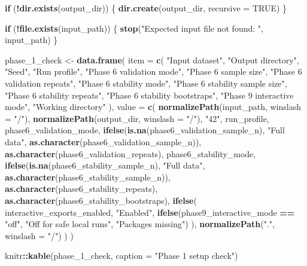 \documentclass[
]{article}
\newenvironment{Shaded}{\begin{snugshade}}{\end{snugshade}}
\newcommand{\AttributeTok}[1]{\textcolor[rgb]{0.13,0.29,0.53}{#1}}
\newcommand{\ConstantTok}[1]{\textcolor[rgb]{0.56,0.35,0.01}{#1}}
\newcommand{\ControlFlowTok}[1]{\textcolor[rgb]{0.13,0.29,0.53}{\textbf{#1}}}
\newcommand{\FunctionTok}[1]{\textcolor[rgb]{0.13,0.29,0.53}{\textbf{#1}}}
\newcommand{\NormalTok}[1]{#1}
\newcommand{\OtherTok}[1]{\textcolor[rgb]{0.56,0.35,0.01}{#1}}
\newcommand{\SpecialCharTok}[1]{\textcolor[rgb]{0.81,0.36,0.00}{\textbf{#1}}}
\newcommand{\StringTok}[1]{\textcolor[rgb]{0.31,0.60,0.02}{#1}}
\begin{document}
\begin{Shaded}
\begin{Highlighting}[]
\ControlFlowTok{if}\NormalTok{ (}\SpecialCharTok{!}\FunctionTok{dir.exists}\NormalTok{(output\_dir)) \{}
  \FunctionTok{dir.create}\NormalTok{(output\_dir, }\AttributeTok{recursive =} \ConstantTok{TRUE}\NormalTok{)}
\NormalTok{\}}

\ControlFlowTok{if}\NormalTok{ (}\SpecialCharTok{!}\FunctionTok{file.exists}\NormalTok{(input\_path)) \{}
  \FunctionTok{stop}\NormalTok{(}\StringTok{"Expected input file not found: "}\NormalTok{, input\_path)}
\NormalTok{\}}

\NormalTok{phase\_1\_check }\OtherTok{\textless{}{-}} \FunctionTok{data.frame}\NormalTok{(}
  \AttributeTok{item =} \FunctionTok{c}\NormalTok{(}
    \StringTok{"Input dataset"}\NormalTok{,}
    \StringTok{"Output directory"}\NormalTok{,}
    \StringTok{"Seed"}\NormalTok{,}
    \StringTok{"Run profile"}\NormalTok{,}
    \StringTok{"Phase 6 validation mode"}\NormalTok{,}
    \StringTok{"Phase 6 sample size"}\NormalTok{,}
    \StringTok{"Phase 6 validation repeats"}\NormalTok{,}
    \StringTok{"Phase 6 stability mode"}\NormalTok{,}
    \StringTok{"Phase 6 stability sample size"}\NormalTok{,}
    \StringTok{"Phase 6 stability repeats"}\NormalTok{,}
    \StringTok{"Phase 6 stability bootstraps"}\NormalTok{,}
    \StringTok{"Phase 9 interactive mode"}\NormalTok{,}
    \StringTok{"Working directory"}
\NormalTok{  ),}
  \AttributeTok{value =} \FunctionTok{c}\NormalTok{(}
    \FunctionTok{normalizePath}\NormalTok{(input\_path, }\AttributeTok{winslash =} \StringTok{"/"}\NormalTok{),}
    \FunctionTok{normalizePath}\NormalTok{(output\_dir, }\AttributeTok{winslash =} \StringTok{"/"}\NormalTok{),}
    \StringTok{"42"}\NormalTok{,}
\NormalTok{    run\_profile,}
\NormalTok{    phase6\_validation\_mode,}
    \FunctionTok{ifelse}\NormalTok{(}\FunctionTok{is.na}\NormalTok{(phase6\_validation\_sample\_n), }\StringTok{"Full data"}\NormalTok{, }\FunctionTok{as.character}\NormalTok{(phase6\_validation\_sample\_n)),}
    \FunctionTok{as.character}\NormalTok{(phase6\_validation\_repeats),}
\NormalTok{    phase6\_stability\_mode,}
    \FunctionTok{ifelse}\NormalTok{(}\FunctionTok{is.na}\NormalTok{(phase6\_stability\_sample\_n), }\StringTok{"Full data"}\NormalTok{, }\FunctionTok{as.character}\NormalTok{(phase6\_stability\_sample\_n)),}
    \FunctionTok{as.character}\NormalTok{(phase6\_stability\_repeats),}
    \FunctionTok{as.character}\NormalTok{(phase6\_stability\_bootstraps),}
    \FunctionTok{ifelse}\NormalTok{(}
\NormalTok{      interactive\_exports\_enabled,}
      \StringTok{"Enabled"}\NormalTok{,}
      \FunctionTok{ifelse}\NormalTok{(phase9\_interactive\_mode }\SpecialCharTok{==} \StringTok{"off"}\NormalTok{, }\StringTok{"Off for safe local runs"}\NormalTok{, }\StringTok{"Packages missing"}\NormalTok{)}
\NormalTok{    ),}
    \FunctionTok{normalizePath}\NormalTok{(}\StringTok{"."}\NormalTok{, }\AttributeTok{winslash =} \StringTok{"/"}\NormalTok{)}
\NormalTok{  )}
\NormalTok{)}

\NormalTok{knitr}\SpecialCharTok{::}\FunctionTok{kable}\NormalTok{(phase\_1\_check, }\AttributeTok{caption =} \StringTok{"Phase 1 setup check"}\NormalTok{)}
\end{Highlighting}
\end{Shaded}
\end{document}
